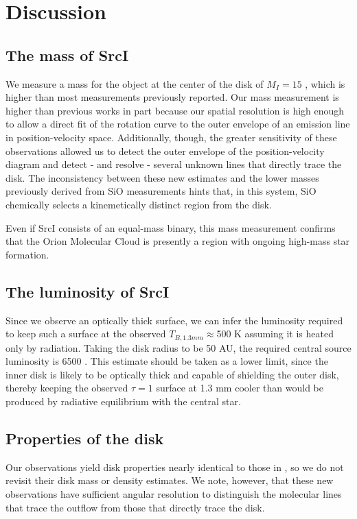 \documentclass[twocolumn]{aastex62}
\newcommand{\sourcei}{SrcI\xspace}
\begin{document}
\section{Discussion}
\label{sec:discussion}
\subsection{The mass of \sourcei}
We measure a mass for the object at the center of the disk of $M_I=15$
\msun, which is higher than most measurements previously reported.  Our mass
measurement is higher than previous works in part because our spatial
resolution is high enough to allow a direct fit of the rotation curve to the
outer envelope of an emission line in position-velocity space.
Additionally, though, the greater sensitivity of these observations allowed
us to detect the outer envelope of the \water position-velocity diagram
and detect - and resolve - several unknown lines that directly trace the disk.
The inconsistency between these new estimates and the lower masses previously
derived from SiO measurements hints that, in this system, SiO chemically
selects a kinemetically distinct region from the disk.

Even if \sourcei consists of an equal-mass binary, this mass measurement
confirms that the Orion Molecular Cloud is presently a region with ongoing
high-mass star formation.

\subsection{The luminosity of \sourcei}
Since we observe an optically thick surface, we can infer the luminosity
required to keep such a surface at the observed $T_{B,1.3 mm}\approx$500 K assuming
it is heated only by radiation.  Taking the disk radius to be 50 AU,
the required central source luminosity is 6500 \lsun.  This estimate
should be taken as a lower limit, since the inner disk is likely to be
optically thick and capable of shielding the outer disk, thereby
keeping the observed $\tau=1$ surface at 1.3 mm cooler than would
be produced by radiative equilibrium with the central star.

\subsection{Properties of the disk}
Our observations yield disk properties nearly identical to those in
\citet{Plambeck2016a}, so we do not revisit their disk mass or density
estimates.  We note, however, that these new observations have sufficient
angular resolution to distinguish the molecular lines that trace the outflow
from those that directly trace the disk.
\end{document}
